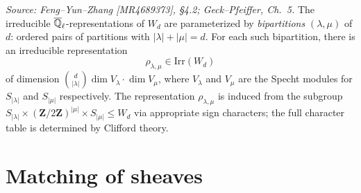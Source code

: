 \begin{definition}
  \label{def:wd-irr-chars}
  \textit{Source: Feng--Yun--Zhang [MR4689373], \S4.2; Geck--Pfeiffer, Ch.~5.}
  The irreducible \(\overline{\mathbb{Q}}_\ell\)-representations of \(W_d\) are parameterized by
  \emph{bipartitions} \((\lambda, \mu)\) of \(d\): ordered pairs of partitions with
  \(|\lambda| + |\mu| = d\). For each such bipartition, there is an irreducible
  representation
  \[
    \rho_{\lambda,\mu} \in \mathrm{Irr}(W_d)
  \]
  of dimension \(\binom{d}{|\lambda|} \dim V_\lambda \cdot \dim V_\mu\),
  where \(V_\lambda\) and \(V_\mu\) are the Specht modules for \(S_{|\lambda|}\)
  and \(S_{|\mu|}\) respectively. The representation \(\rho_{\lambda,\mu}\) is
  induced from the subgroup \(S_{|\lambda|} \times (\mathbf{Z}/2\mathbf{Z})^{|\mu|}
  \times S_{|\mu|} \leq W_d\) via appropriate sign characters; the full character
  table is determined by Clifford theory.
\end{definition}

\section{Matching of sheaves}

